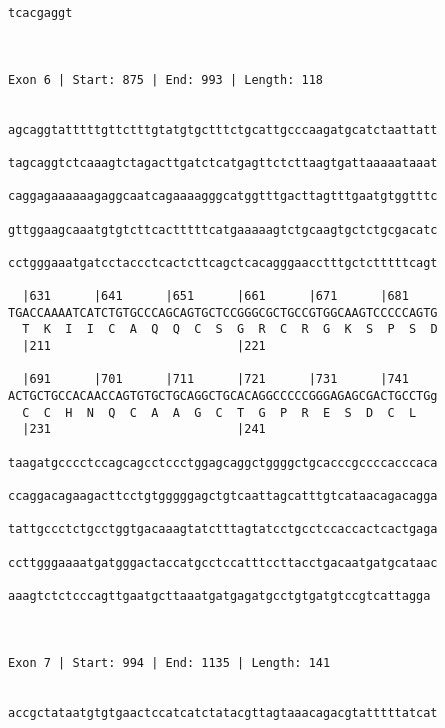 \documentclass{article}
\begin{document}
\begin{Verbatim}
tcacgaggt
         
         
 
Exon 6 | Start: 875 | End: 993 | Length: 118


agcaggtatttttgttctttgtatgtgctttctgcattgcccaagatgcatctaattatt
                                                            
tagcaggtctcaaagtctagacttgatctcatgagttctcttaagtgattaaaaataaat
                                                            
caggagaaaaaagaggcaatcagaaaagggcatggtttgacttagtttgaatgtggtttc
                                                            
gttggaagcaaatgtgtcttcactttttcatgaaaaagtctgcaagtgctctgcgacatc
                                                            
cctgggaaatgatcctaccctcactcttcagctcacagggaacctttgctctttttcagt
                                                            
  |631      |641      |651      |661      |671      |681    
TGACCAAAATCATCTGTGCCCAGCAGTGCTCCGGGCGCTGCCGTGGCAAGTCCCCCAGTG
  T  K  I  I  C  A  Q  Q  C  S  G  R  C  R  G  K  S  P  S  D
  |211                          |221                        
  
  |691      |701      |711      |721      |731      |741    
ACTGCTGCCACAACCAGTGTGCTGCAGGCTGCACAGGCCCCCGGGAGAGCGACTGCCTGg
  C  C  H  N  Q  C  A  A  G  C  T  G  P  R  E  S  D  C  L   
  |231                          |241                        
  
taagatgcccctccagcagcctccctggagcaggctggggctgcacccgccccacccaca
                                                            
ccaggacagaagacttcctgtgggggagctgtcaattagcatttgtcataacagacagga
                                                            
tattgccctctgcctggtgacaaagtatctttagtatcctgcctccaccactcactgaga
                                                            
ccttgggaaaatgatgggactaccatgcctccatttccttacctgacaatgatgcataac
                                                            
aaagtctctcccagttgaatgcttaaatgatgagatgcctgtgatgtccgtcattagga
                                                           
                                                           
 
Exon 7 | Start: 994 | End: 1135 | Length: 141


accgctataatgtgtgaactccatcatctatacgttagtaaacagacgtatttttatcat
                                                            

\end{Verbatim}
\end{document}
